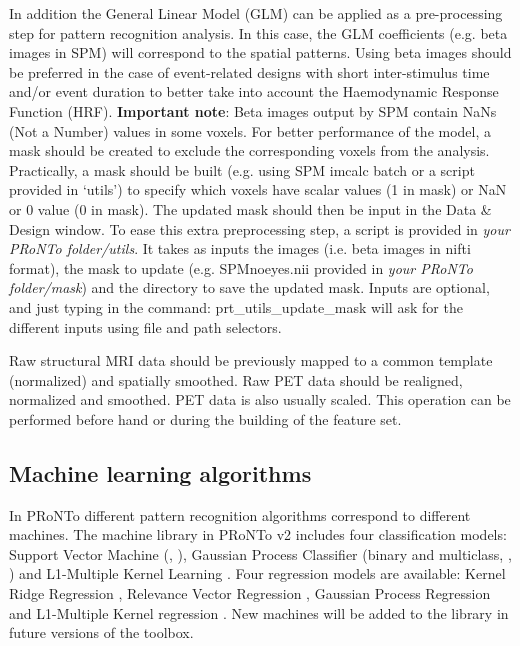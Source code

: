 In addition the General Linear Model (GLM) can be applied as a pre-processing step for pattern recognition analysis. In this case, the GLM coefficients (e.g. beta images in SPM) will correspond to the spatial patterns. Using beta images should be preferred in the case of event-related designs with short inter-stimulus time and/or event duration to better take into account the Haemodynamic Response Function (HRF). \textbf{Important note}: Beta images output by SPM contain NaNs (Not a Number) values in some voxels. For better performance of the model, a mask should be created to exclude the corresponding voxels from the analysis. Practically, a mask should be built (e.g. using SPM imcalc batch or a script provided in `utils') to specify which voxels have scalar values (1 in mask) or NaN or 0 value (0 in mask). The updated mask should then be input in the Data \& Design window. To ease this extra preprocessing step, a script is provided in \textit{your PRoNTo folder/utils}. It takes as inputs the images (i.e. beta images in nifti format), the mask to update (e.g. SPMnoeyes.nii provided in \textit{your PRoNTo folder/mask}) and the directory to save the updated mask. Inputs are optional, and just typing in the \matlab command: prt\_utils\_update\_mask will ask for the different inputs using file and path selectors.

Raw structural MRI data should be previously mapped to a common template (normalized) and spatially smoothed. Raw PET data should be realigned, normalized and smoothed. PET data is also usually scaled. This operation can be performed before hand or during the building of the feature set.


\subsection{Machine learning algorithms}

In PRoNTo different pattern recognition algorithms correspond to different machines. The machine library in PRoNTo v2 includes four classification models: Support Vector Machine (\cite{Cristianini2000}, \cite{Mourao-Miranda2007}), Gaussian Process Classifier (binary and multiclass, \cite{Rasmussen2006}, \cite{Marquand2010}) and L1-Multiple Kernel Learning \cite{Rakotomamonjy2008}. Four regression models are available: Kernel Ridge Regression \cite{ShaweTaylor2004}, Relevance Vector Regression \cite{Tipping2001}, Gaussian Process Regression \cite{Rasmussen2006} and L1-Multiple Kernel regression \cite{Rakotomamonjy2008}. New machines will be added to the library in future versions of the toolbox. %

